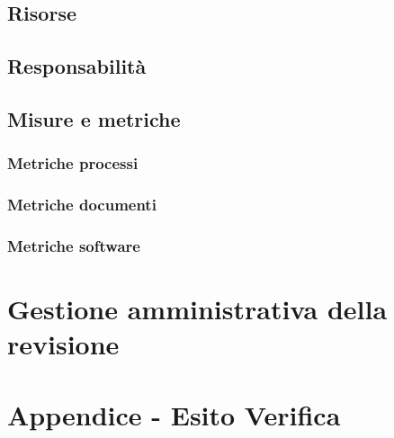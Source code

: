 \documentclass[a4paper, oneside, openany, dvipsnames, table]{article}
\begin{document}
	\subsection{Risorse}
	\subsection{Responsabilità}
	\subsection{Misure e metriche}
		\subsubsection{Metriche processi}
		\subsubsection{Metriche documenti}
		\subsubsection{Metriche software}
\section{Gestione amministrativa della revisione}

\section{Appendice - Esito Verifica}
\end{document}
